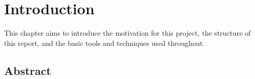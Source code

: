 \chapter{Introduction}

This chapter aims to introduce the motivation for this project, the structure of this report, and the basic tools and techniques used throughout.

\section{Abstract}
